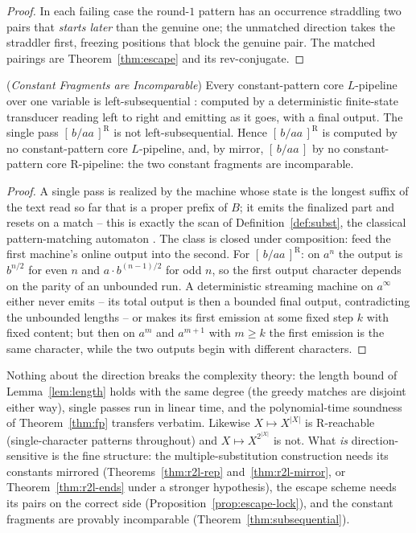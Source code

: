 \documentclass[runningheads,envcountsect]{llncs}
\begin{document}
\begin{proof}
    In each failing case the round-$1$ pattern has an occurrence straddling two pairs that \emph{starts later} than the genuine one; the unmatched direction takes the straddler first, freezing positions that block the genuine pair. The matched pairings are Theorem~\ref{thm:escape} and its rev-conjugate.
\end{proof}

\begin{theorem}
    (\emph{Constant Fragments are Incomparable})
    \label{thm:subsequential}
    Every constant-pattern core $L$-pipeline over one variable is left-subsequential \cite{berstel79,elgot65}: computed by a deterministic finite-state transducer reading left to right and emitting as it goes, with a final output. The single pass $[\,b/aa\,]^{\mathrm{R}}$ is not left-subsequential. Hence $[\,b/aa\,]^{\mathrm{R}}$ is computed by no constant-pattern core $L$-pipeline, and, by mirror, $[\,b/aa\,]$ by no constant-pattern core $\mathrm{R}$-pipeline: the two constant fragments are incomparable.
\end{theorem}

\begin{proof}
    A single pass is realized by the machine whose state is the longest suffix of the text read so far that is a proper prefix of $B$; it emits the finalized part and resets on a match -- this is exactly the scan of Definition~\ref{def:subst}, the classical pattern-matching automaton \cite{knuth77,aho75}. The class is closed under composition: feed the first machine's online output into the second. For $[\,b/aa\,]^{\mathrm{R}}$: on $a^n$ the output is $b^{n/2}$ for even $n$ and $a\cdot b^{(n-1)/2}$ for odd $n$, so the first output character depends on the parity of an unbounded run. A deterministic streaming machine on $a^{\infty}$ either never emits -- its total output is then a bounded final output, contradicting the unbounded lengths -- or makes its first emission at some fixed step $k$ with fixed content; but then on $a^m$ and $a^{m+1}$ with $m \geq k$ the first emission is the same character, while the two outputs begin with different characters.
\end{proof}

Nothing about the direction breaks the complexity theory: the length bound of Lemma~\ref{lem:length} holds with the same degree (the greedy matches are disjoint either way), single passes run in linear time, and the polynomial-time soundness of Theorem~\ref{thm:fp} transfers verbatim. Likewise $X \mapsto X^{|X|}$ is $\mathrm{R}$-reachable (single-character patterns throughout) and $X \mapsto X^{2^{|X|}}$ is not. What \emph{is} direction-sensitive is the fine structure: the multiple-substitution construction needs its constants mirrored (Theorems~\ref{thm:r2l-rep} and~\ref{thm:r2l-mirror}, or Theorem~\ref{thm:r2l-ends} under a stronger hypothesis), the escape scheme needs its pairs on the correct side (Proposition~\ref{prop:escape-lock}), and the constant fragments are provably incomparable (Theorem~\ref{thm:subsequential}).
\end{document}
